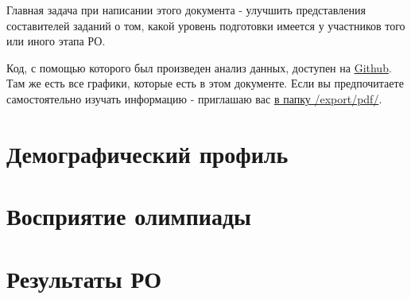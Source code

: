 \documentclass[12pt,openany]{extbook}
\begin{document}
\begin{titlepage}
\begin{minipage}{0.93\textwidth}
\begin{flushleft}
Главная задача при написании этого документа - улучшить представления составителей заданий о том, какой уровень подготовки имеется у участников того или иного этапа РО. 
\vspace{0.5em}

Код, с помощью которого был произведен анализ данных, доступен на \href{https://github.com/anmorgunov/respa-data-analysis}{Github}. Там же есть все графики, которые есть в этом документе. Если вы предпочитаете самостоятельно изучать информацию - приглашаю вас \href{https://github.com/anmorgunov/respa-data-analysis/tree/main/export/pdf}{в папку /export/pdf/}.
\end{flushleft}
\end{minipage}


\end{titlepage}


\def\contentsname{Содержание}
\tableofcontents

% 

% 

\chapter{Демографический профиль}


\chapter{Восприятие олимпиады}


\chapter{Результаты РО}

\end{document}
